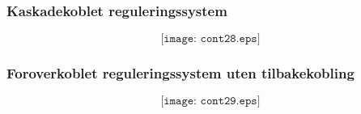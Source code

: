 \documentclass{beamer}
\begin{document}
%
%
%
%
\begin{frame}
	\frametitle{Kaskadekoblet reguleringssystem}

	
$$\texttt{[image: cont28.eps]}$$

\end{frame}


%
\begin{frame}
	\frametitle{Foroverkoblet reguleringssystem uten tilbakekobling}

	
$$\texttt{[image: cont29.eps]}$$

\end{frame}
\end{document}
